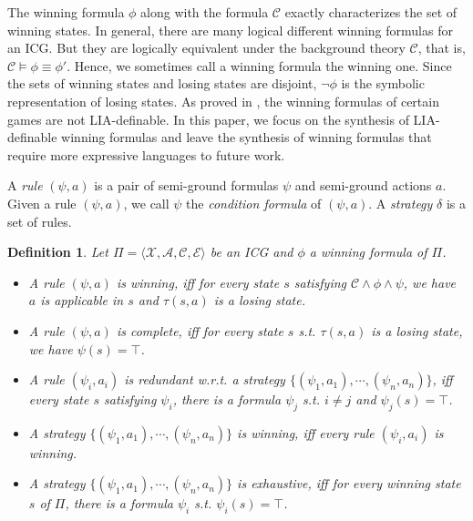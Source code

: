 \documentclass[review]{elsarticle}
\newcommand{\set}[1]{\{ #1 \}}
\newcommand{\tuple}[1]{\langle {#1} \rangle}
\newcommand{\true}{\top}
\newcommand{\statevar}{\mathcal{X}}
\newcommand{\act}{\mathcal{A}}
\newcommand{\constraint}{\mathcal{C}}
\newcommand{\estate}{\mathcal{E}}
\newcommand{\suc}{\tau}
\newtheorem{definition}{Definition}
\newcommand{\largestInt}[1][]{\lfloor#1\rfloor}
\begin{document}
	The winning formula $\phi$ along with the formula $\constraint$ exactly characterizes the set of winning states.
	In general, there are many logical different winning formulas for an ICG.
	But they are logically equivalent under the background theory $\constraint$, that is, $\constraint \models \phi \equiv \phi'$.
	Hence, we sometimes call a winning formula the winning one.
	Since the sets of winning states and losing states are disjoint, $\neg \phi$ is the symbolic representation of losing states.
	As proved in \cite{Fra2011}, the winning formulas of certain games are not LIA-definable.
	In this paper, we focus on the synthesis of LIA-definable winning formulas and leave the synthesis of winning formulas that require more expressive languages to future work.
	    
	A \textit{rule} $(\psi, a)$ is a pair of semi-ground formulas $\psi$ and semi-ground actions $a$.
	Given a rule $(\psi, a)$, we call $\psi$ the \textit{condition formula} of $(\psi, a)$.
	A \textit{strategy} $\delta$ is a set of rules.
	\begin{definition} \label{def:winRule} \rm
		Let $\Pi = \tuple{\statevar, \act, \constraint, \estate}$ be an ICG and $\phi$ a winning formula of $\Pi$.
		\begin{itemize}
			\item A rule $(\psi, a)$ is \textit{winning}, iff for every state $s$ satisfying $\constraint \land \phi \land \psi$, we have $a$ is applicable in $s$ and $\suc(s, a)$ is a losing state.
			
			\item A rule $(\psi, a)$ is \textit{complete}, iff for every state $s$ s.t. $\suc(s, a)$ is a losing state, we have $\psi(s) = \true$.
			
			\item A rule $(\psi_i, a_i)$ is \textit{redundant} w.r.t. a strategy $\set{(\psi_1, a_1), \cdots, (\psi_n, a_n)}$, iff every state $s$ satisfying $\psi_i$, there is a formula $\psi_j$ s.t. $i \neq j$ and $\psi_j(s) = \true$.
			
			\item A strategy $\set{(\psi_1, a_1), \cdots, (\psi_n, a_n)}$ is \textit{winning}, iff every rule $(\psi_i, a_i)$ is winning.
			
			\item A strategy $\set{(\psi_1, a_1), \cdots, (\psi_n, a_n)}$ is \textit{exhaustive}, iff for every winning state $s$ of $\Pi$, there is a formula $\psi_i$ s.t. $\psi_i(s) = \true$.			
		\end{itemize}
	\end{definition}
	
\end{document}
